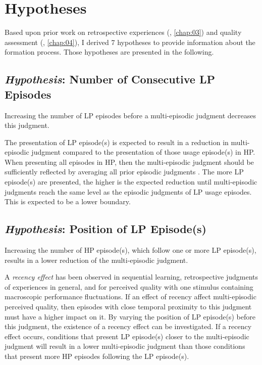 \section{Hypotheses}
Based upon prior work on retrospective experiences (\cf, \autoref{chap:03}) and quality assessment (\cf, \autoref{chap:04}), I derived 7 hypotheses to provide information about the formation process.
Those hypotheses are presented in the following.

\subsection{\emph{Hypothesis}: Number of Consecutive \acs{LP} Episodes}
\begin{hypothesis}\label{hypo:number}
Increasing the number of \ac{LP} episodes before a multi-episodic judgment decreases this judgment.
\end{hypothesis}

The presentation of \ac{LP} episode(s) is expected to result in a reduction in multi-episodic judgment compared to the presentation of those usage episode(s) in \ac{HP}.
When presenting all episodes in \ac{HP}, then the multi-episodic judgment should be sufficiently reflected by averaging all prior episodic judgments \citep[\cf,][]{moller_single-call_2011}.
The more \ac{LP} episode(s) are presented, the higher is the expected reduction until multi-episodic judgments reach the same level as the episodic judgments of \ac{LP} usage episodes.
This is expected to be a lower boundary.

\subsection{\emph{Hypothesis}: Position of \acs{LP} Episode(s)}
\begin{hypothesis}\label{hypo:position}
Increasing the number of \ac{HP} episode(s), which follow one or more \ac{LP} episode(s), results in a lower reduction of the multi-episodic judgment.
\end{hypothesis}

A \emph{recency effect} has been observed in sequential learning, retrospective judgments of experiences in general, and for perceived quality with one stimulus containing macroscopic performance fluctuations.
If an effect of recency affect multi-episodic perceived quality, then episodes with close temporal proximity to this judgment must have a higher impact on it.
By varying the position of \ac{LP} episode(s) before this judgment, the existence of a recency effect can be investigated.
If a recency effect occurs, conditions that present \ac{LP} episode(s) closer to the multi-episodic judgment will result in a lower multi-episodic judgment than those conditions that present more \ac{HP} episodes following the \ac{LP} episode(s).

